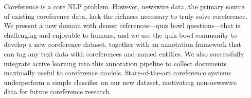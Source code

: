 Coreference is a core NLP problem. However, newswire data, the primary source of existing coreference data, lack the richness necessary to truly solve coreference. We present a new domain with denser references---quiz bowl questions---that is challenging and enjoyable to humans, and we use the quiz bowl community to develop a new coreference dataset, together with an annotation framework that can tag any text data with coreferences and named entities. We also successfully integrate active learning into this annotation pipeline to collect documents maximally useful to coreference models. State-of-the-art coreference systems underperform a simple classifier on our new dataset, motivating non-newswire data for future coreference research.
